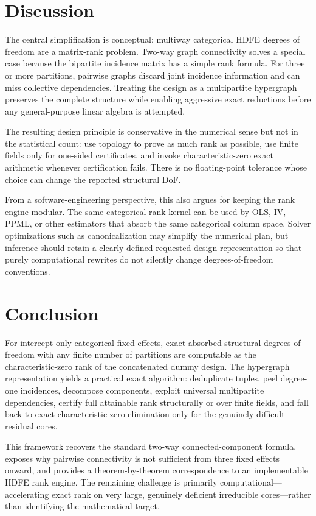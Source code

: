 \documentclass[11pt]{article}
\theoremstyle{definition}
\newcommand{\1}{\mathbf{1}}
\begin{document}
\section{Discussion}

The central simplification is conceptual: multiway categorical HDFE degrees of freedom are a matrix-rank problem. Two-way graph connectivity solves a special case because the bipartite incidence matrix has a simple rank formula. For three or more partitions, pairwise graphs discard joint incidence information and can miss collective dependencies. Treating the design as a multipartite hypergraph preserves the complete structure while enabling aggressive exact reductions before any general-purpose linear algebra is attempted.

The resulting design principle is conservative in the numerical sense but not in the statistical count: use topology to prove as much rank as possible, use finite fields only for one-sided certificates, and invoke characteristic-zero exact arithmetic whenever certification fails. There is no floating-point tolerance whose choice can change the reported structural DoF.

From a software-engineering perspective, this also argues for keeping the rank engine modular. The same categorical rank kernel can be used by OLS, IV, PPML, or other estimators that absorb the same categorical column space. Solver optimizations such as canonicalization may simplify the numerical plan, but inference should retain a clearly defined requested-design representation so that purely computational rewrites do not silently change degrees-of-freedom conventions.

\section{Conclusion}

For intercept-only categorical fixed effects, exact absorbed structural degrees of freedom with any finite number of partitions are computable as the characteristic-zero rank of the concatenated dummy design. The hypergraph representation yields a practical exact algorithm: deduplicate tuples, peel degree-one incidences, decompose components, exploit universal multipartite dependencies, certify full attainable rank structurally or over finite fields, and fall back to exact characteristic-zero elimination only for the genuinely difficult residual cores.

This framework recovers the standard two-way connected-component formula, exposes why pairwise connectivity is not sufficient from three fixed effects onward, and provides a theorem-by-theorem correspondence to an implementable HDFE rank engine. The remaining challenge is primarily computational---accelerating exact rank on very large, genuinely deficient irreducible cores---rather than identifying the mathematical target.
\end{document}
